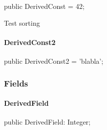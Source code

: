 \documentclass{report}
\begin{document}
\begin{list}{}{
\setlength{\itemindent}{0cm}
\setlength{\listparindent}{0cm}
\setlength{\leftmargin}{\evensidemargin}
\addtolength{\leftmargin}{\tmplength}
\settowidth{\labelsep}{X}
\addtolength{\leftmargin}{\labelsep}
\setlength{\labelwidth}{\tmplength}
}
\begin{flushleft}
\item[\textbf{Declaration}\hfill]
\begin{ttfamily}
public DerivedConst = 42;\end{ttfamily}


\end{flushleft}
\par
\item[\textbf{Description}]
Test sorting

\end{list}
\paragraph*{DerivedConst2}\hspace*{\fill}

\begin{list}{}{
\setlength{\itemindent}{0cm}
\setlength{\listparindent}{0cm}
\setlength{\leftmargin}{\evensidemargin}
\addtolength{\leftmargin}{\tmplength}
\settowidth{\labelsep}{X}
\addtolength{\leftmargin}{\labelsep}
\setlength{\labelwidth}{\tmplength}
}
\begin{flushleft}
\item[\textbf{Declaration}\hfill]
\begin{ttfamily}
public DerivedConst2 = 'blabla';\end{ttfamily}


\end{flushleft}
\end{list}
\subsubsection*{\large{\textbf{Fields}}\normalsize\hspace{1ex}\hfill}
\paragraph*{DerivedField}\hspace*{\fill}

\begin{list}{}{
\setlength{\itemindent}{0cm}
\setlength{\listparindent}{0cm}
\setlength{\leftmargin}{\evensidemargin}
\addtolength{\leftmargin}{\tmplength}
\settowidth{\labelsep}{X}
\addtolength{\leftmargin}{\labelsep}
\setlength{\labelwidth}{\tmplength}
}
\begin{flushleft}
\item[\textbf{Declaration}\hfill]
\begin{ttfamily}
public DerivedField: Integer;\end{ttfamily}


\end{flushleft}
\end{list}
\end{document}
